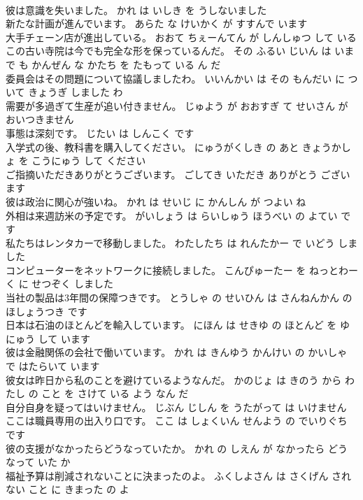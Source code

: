 \documentclass[8pt]{extreport}
\begin{document}
\begin{CJK}{UTF8}{min}
\\	彼は意識を失いました。	かれ は いしき を うしないました 
\\	新たな計画が進んでいます。	あらた な けいかく が すすんで います 
\\	大手チェーン店が進出している。	おおて ちぇーんてん が しんしゅつ して いる 
\\	この古い寺院は今でも完全な形を保っているんだ。	その ふるい じいん は いま で も かんぜん な かたち を たもって いる ん だ 
\\	委員会はその問題について協議しましたわ。	いいんかい は その もんだい に ついて きょうぎ しました わ 
\\	需要が多過ぎて生産が追い付きません。	じゅよう が おおすぎ て せいさん が おいつきません 
\\	事態は深刻です。	じたい は しんこく です 
\\	入学式の後、教科書を購入してください。	にゅうがくしき の あと きょうかしょ を こうにゅう して ください 
\\	ご指摘いただきありがとうございます。	ごしてき いただき ありがとう ございます 
\\	彼は政治に関心が強いね。	かれ は せいじ に かんしん が つよい ね 
\\	外相は来週訪米の予定です。	がいしょう は らいしゅう ほうべい の よてい です 
\\	私たちはレンタカーで移動しました。	わたしたち は れんたかー で いどう しました 
\\	コンピューターをネットワークに接続しました。	こんぴゅーたー を ねっとわーく に せつぞく しました 
\\	当社の製品は3年間の保障つきです。	とうしゃ の せいひん は さんねんかん の ほしょうつき です 
\\	日本は石油のほとんどを輸入しています。	にほん は せきゆ の ほとんど を ゆにゅう して います 
\\	彼は金融関係の会社で働いています。	かれ は きんゆう かんけい の かいしゃ で はたらいて います 
\\	彼女は昨日から私のことを避けているようなんだ。	かのじょ は きのう から わたし の こと を さけて いる よう なん だ 
\\	自分自身を疑ってはいけません。	じぶん じしん を うたがって は いけません 
\\	ここは職員専用の出入り口です。	ここ は しょくいん せんよう の でいりぐち です 
\\	彼の支援がなかったらどうなっていたか。	かれ の しえん が なかったら どう なって いた か 
\\	福祉予算は削減されないことに決まったのよ。	ふくしよさん は さくげん されない こと に きまった の よ 

\end{CJK}
\end{document}
